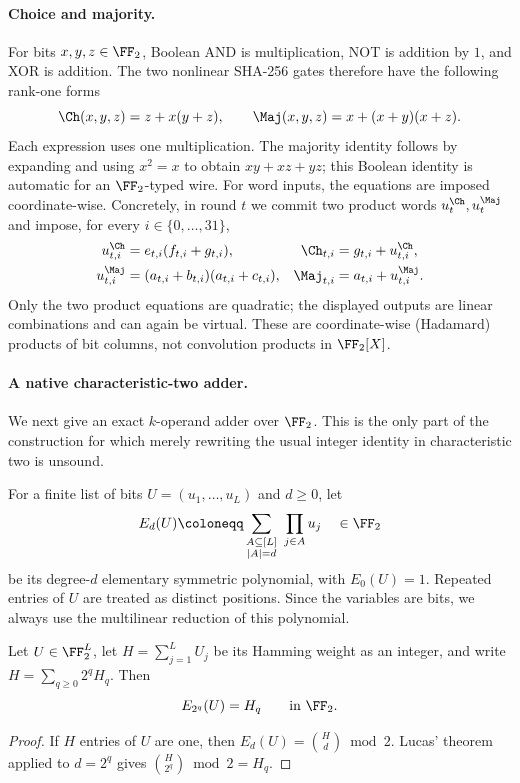 \paragraph{Choice and majority.}
For bits $x,y,z\in\FF_2$, Boolean AND is multiplication, NOT is addition by
$1$, and XOR is addition.  The two nonlinear SHA-256 gates therefore have the
following rank-one forms
\begin{equation}\label{eq:sha-f2-ch-maj-anf}
  \Ch(x,y,z)=z+x(y+z),
  \qquad
  \Maj(x,y,z)=x+(x+y)(x+z).
\end{equation}
Each expression uses one multiplication.  The majority identity follows by
expanding and using $x^2=x$ to obtain $xy+xz+yz$; this Boolean identity is
automatic for an $\FF_2$-typed wire.  For word inputs, the
equations are imposed coordinate-wise.  Concretely, in round $t$ we commit
two product words $u^{\Ch}_t,u^{\Maj}_t$ and impose, for every
$i\in\{0,\ldots,31\}$,
\begin{equation}\label{eq:sha-f2-gate-constraints}
\begin{aligned}
 u^{\Ch}_{t,i}      &=e_{t,i}(f_{t,i}+g_{t,i}),
 &\Ch_{t,i}         &=g_{t,i}+u^{\Ch}_{t,i},\\
 u^{\Maj}_{t,i}     &=(a_{t,i}+b_{t,i})(a_{t,i}+c_{t,i}),
 &\Maj_{t,i}         &=a_{t,i}+u^{\Maj}_{t,i}.
\end{aligned}
\end{equation}
Only the two product equations are quadratic; the displayed outputs are
linear combinations and can again be virtual.  These are coordinate-wise
(Hadamard) products of bit columns, not convolution products in
$\FF_2[X]$.

\paragraph{A native characteristic-two adder.}
We next give an exact $k$-operand adder over $\FF_2$.  This is the only part of
the construction for which merely rewriting the usual integer identity in
characteristic two is unsound.

For a finite list of bits $U=(u_1,\ldots,u_L)$ and $d\geq0$, let
\[
  E_d(U)\coloneqq
  \sum_{\substack{A\subseteq[L]\\|A|=d}}\ \prod_{j\in A}u_j
  \quad\in\FF_2
\]
be its degree-$d$ elementary symmetric polynomial, with $E_0(U)=1$.
Repeated entries of $U$ are treated as distinct positions.  Since the
variables are bits, we always use the multilinear reduction of this
polynomial.

\begin{lemma}\label{lem:sha-f2-digit-extraction}
Let $U\in\FF_2^L$, let $H=\sum_{j=1}^L U_j$ be its Hamming weight as an
integer, and write $H=\sum_{q\geq0}2^qH_q$.  Then
\[
  E_{2^q}(U)=H_q\qquad\text{in }\FF_2.
\]
\end{lemma}
\begin{proof}
If $H$ entries of $U$ are one, then
$E_d(U)=\binom{H}{d}\bmod2$.  Lucas' theorem applied to
$d=2^q$ gives $\binom{H}{2^q}\bmod2=H_q$.
\end{proof}

